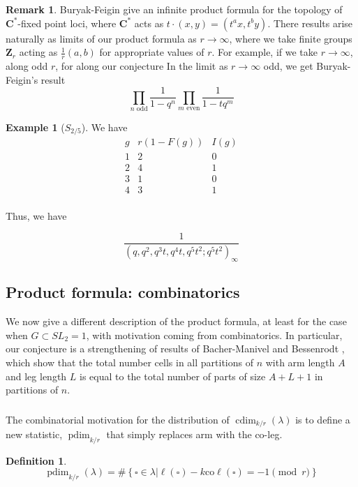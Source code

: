 \documentclass{amsart}[12pt]
\theoremstyle{definition}
\newtheorem{example}[dummy]{Example}
\newtheorem{definition}[dummy]{Definition}
\newtheorem{remark}[dummy]{Remark}
\newcommand{\Z}{\mathbf{Z}}
\newcommand{\C}{\mathbf{C}}
\newcommand{\coleg}{\text{co}\ell}
\DeclareMathOperator{\dusty}{pdim}
\DeclareMathOperator{\cdim}{cdim}
\begin{document}
\begin{remark}
  Buryak-Feigin give an infinite product formula for the topology of $\C^*$-fixed point loci, where $\C^*$ acts as $t\cdot(x,y)=(t^ax,t^by)$.  There results arise naturally as limits of our product formula as $r\to \infty$, where we take finite groups $\Z_r$ acting as $\frac{1}{r}(a,b)$ for appropriate values of $r$.
  For example, if we take $r\to\infty$, along odd $r$, for  along our conjecture 
  In the limit as $r\to\infty$ odd, we get Buryak-Feigin's result
  $$\prod_{n \text{ odd}} \frac{1}{1-q^n}\prod_{m \text{ even}}\frac{1}{1-tq^m}$$



\end{remark}


\begin{example}[$S_{2/5}$]
We have
$$\begin{array}{r|c|l}
g & r(1-F(g)) & I(g) \\
\hline
1 & 2 & 0 \\
2 & 4 & 1 \\
3 & 1 & 0 \\
4 & 3 & 1 \\
\end{array}
$$

Thus, we have


$$
\frac{1}{(q, q^2,q^3t, q^4t, q^5t^2; q^5t^2)_\infty}
$$
\end{example}


\subsection{Product formula: combinatorics}
\label{sec:prod-comb}

We now give a different description of the product formula, at least for the case when $G\subset SL_2=1$, with motivation coming from combinatorics.  In particular, our conjecture is a strengthening of results of Bacher-Manivel \cite{BM} and Bessenrodt \cite{Bess}, which show that the total number cells in all partitions of $n$ with arm length $A$ and leg length $L$ is equal to the total number of parts of size $A+L+1$ in partitions of $n$.

\subsubsection{ }

The combinatorial motivation for the distribution of $\cdim_{k/r}(\lambda)$ is to define a new statistic, $\dusty_{k/r}$ that simply replaces arm with the co-leg.
\begin{definition}
$$\dusty_{k/r}(\lambda)=\#\left\{\square\in\lambda\Big| \ell(\square)-k\coleg(\square)=-1\pmod r\right\}$$
\end{definition}
\end{document}
